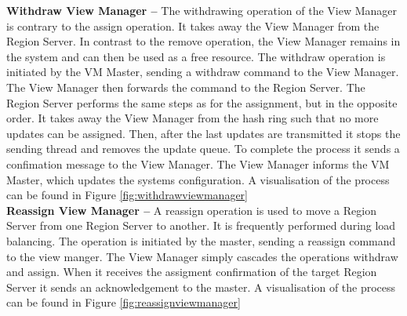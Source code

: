 \documentclass[11pt,a4paper,bibtotoc,idxtotoc,headsepline,footsepline,footexclude,BCOR12mm,DIV13]{scrbook}
\begin{document}
\noindent  
\textbf{Withdraw View Manager -- }The withdrawing operation of the View Manager is contrary to the assign operation. It takes away the View Manager from the Region Server. In contrast to the remove operation, the View Manager remains in the system and can then be used as a free resource. The withdraw operation is initiated by the VM Master, sending a withdraw command to the View Manager. The View Manager then forwards the command to the Region Server. The Region Server performs the same steps as for the assignment, but in the opposite order. It takes away the View Manager from the hash ring such that no more updates can be assigned. Then, after the last updates are transmitted it stops the sending thread and removes the update queue. To complete the process it sends a confimation message to the View Manager. The View Manager informs the VM Master, which updates the systems configuration. A visualisation of the process can be found in Figure \ref{fig:withdrawviewmanager}\\

\noindent  
\textbf{Reassign View Manager -- }A reassign operation is used to move a Region Server from one Region Server to another. It is frequently performed during load balancing. The operation is initiated by the master, sending a reassign command to the view manger. The View Manager simply cascades the operations withdraw and assign. When it receives the assigment confirmation of the target Region Server it sends an acknowledgement to the master. A visualisation of the process can be found in Figure \ref{fig:reassignviewmanager}\\

\end{document}

